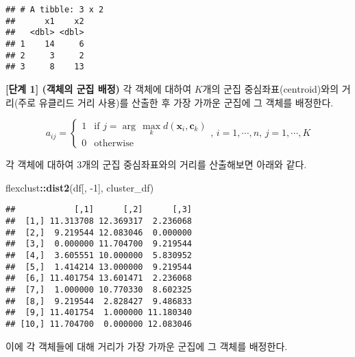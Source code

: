 \documentclass[]{book}
\newenvironment{Shaded}{\begin{snugshade}}{\end{snugshade}}
\newcommand{\ControlFlowTok}[1]{\textcolor[rgb]{0.13,0.29,0.53}{\textbf{#1}}}
\newcommand{\DecValTok}[1]{\textcolor[rgb]{0.00,0.00,0.81}{#1}}
\newcommand{\KeywordTok}[1]{\textcolor[rgb]{0.13,0.29,0.53}{\textbf{#1}}}
\newcommand{\NormalTok}[1]{#1}
\newcommand{\OperatorTok}[1]{\textcolor[rgb]{0.81,0.36,0.00}{\textbf{#1}}}
\newcommand{\StringTok}[1]{\textcolor[rgb]{0.31,0.60,0.02}{#1}}
\begin{document}
\begin{verbatim}
## # A tibble: 3 x 2
##      x1    x2
##   <dbl> <dbl>
## 1    14     6
## 2     3     2
## 3     8    13
\end{verbatim}

\textbf{{[}단계 1{]} (객체의 군집 배정)} 각 객체에 대하여 \(K\)개의 군집 중심좌표(centroid)와의 거리(주로 유클리드 거리 사용)를 산출한 후 가장 가까운 군집에 그 객체를 배정한다.

\begin{equation*}
a_{ij} = \begin{cases}
1 & \text{if } j = \arg\,\max_k d(\mathbf{x}_i, \mathbf{c}_k)\\
0 & \text{otherwise}
\end{cases}, \, i = 1, \cdots, n, \, j = 1, \cdots, K
\end{equation*}

각 객체에 대하여 3개의 군집 중심좌표와의 거리를 산출해보면 아래와 같다.

\begin{Shaded}
\begin{Highlighting}[]
\NormalTok{flexclust}\OperatorTok{::}\KeywordTok{dist2}\NormalTok{(df[, }\DecValTok{-1}\NormalTok{], cluster_df)}
\end{Highlighting}
\end{Shaded}

\begin{verbatim}
##            [,1]      [,2]      [,3]
##  [1,] 11.313708 12.369317  2.236068
##  [2,]  9.219544 12.083046  0.000000
##  [3,]  0.000000 11.704700  9.219544
##  [4,]  3.605551 10.000000  5.830952
##  [5,]  1.414214 13.000000  9.219544
##  [6,] 11.401754 13.601471  2.236068
##  [7,]  1.000000 10.770330  8.602325
##  [8,]  9.219544  2.828427  9.486833
##  [9,] 11.401754  1.000000 11.180340
## [10,] 11.704700  0.000000 12.083046
\end{verbatim}

이에 각 객체들에 대해 거리가 가장 가까운 군집에 그 객체를 배정한다.

\begin{Shaded}
\end{Shaded}
\end{document}
